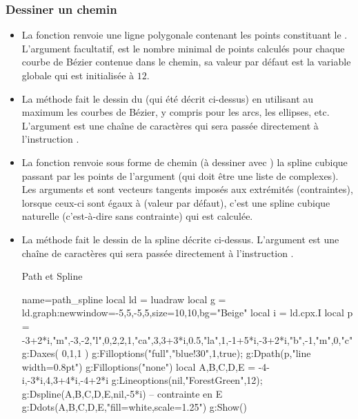 \subsubsection{Dessiner un chemin}

\begin{itemize}
\item La fonction  renvoie une ligne polygonale contenant les points constituant le . L'argument facultatif,  est le nombre minimal de points calculés pour chaque courbe de Bézier contenue dans le chemin, sa valeur par défaut est la variable globale  qui est initialisée à $12$.

\item La méthode  fait le dessin du  (qui été décrit ci-dessus) en utilisant au maximum les courbes de Bézier, y compris pour les arcs, les ellipses, etc. L'argument  est une chaîne de caractères qui sera passée directement à l'instruction \drawcmd.
 
\item La fonction  renvoie sous forme de chemin (à dessiner avec ) la spline cubique passant par les points de l'argument  (qui doit être une liste de complexes). Les arguments  et  sont vecteurs tangents imposés aux extrémités (contraintes), lorsque ceux-ci sont égaux à \nil (valeur par défaut), c'est une spline cubique naturelle (c'est-à-dire sans contrainte) qui est calculée.

\item La méthode  fait le dessin de la spline décrite ci-dessus. L'argument  est une chaîne de caractères qui sera passée directement à l'instruction \drawcmd.

\begin{demo}{Path et Spline}
\begin{luadraw}{name=path_spline}
local ld = luadraw
local g = ld.graph:new{window={-5,5,-5,5},size={10,10},bg="Beige"}
local i = ld.cpx.I
local p = {-3+2*i,"m",-3,-2,"l",0,2,2,1,"ca",3,3+3*i,0.5,"la",1,-1+5*i,-3+2*i,"b",-1,"m",0,"c"}
g:Daxes( {0,1,1} )
g:Filloptions("full","blue!30",1,true); g:Dpath(p,"line width=0.8pt")
g:Filloptions("none")
local A,B,C,D,E = -4-i,-3*i,4,3+4*i,-4+2*i
g:Lineoptions(nil,"ForestGreen",12); g:Dspline({A,B,C,D,E},nil,-5*i) -- contrainte en E
g:Ddots({A,B,C,D,E},"fill=white,scale=1.25")
g:Show()
\end{luadraw}
\end{demo}


\end{itemize}
